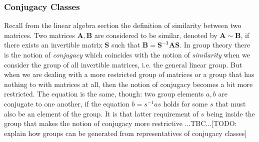 





\subsubsection{Conjugacy Classes}
Recall from the linear algebra section the definition of similarity between two matrices. Two matrices $\mathbf{A,B}$ are considered to be similar, denoted by $\mathbf{A} \sim \mathbf{B}$, if there exists an invertible matrix $\mathbf{S}$ such that $\mathbf{B} = \mathbf{S^{-1} A S}$. In group theory there is the notion of \emph{conjugacy} which coincides with the notion of \emph{similarity} when we consider the group of all invertible matrices, i.e. the general linear group. But when we are dealing with a more restricted group of matrices or a group that has nothing to with matrices at all, then the notion of conjugacy becomes a bit more restricted. The equation is the same, though: two group elements $a,b$ are conjugate to one another, if the equation $b = s^{-1} a s$ holds for some $s$ that must also be an element of the group. It is that latter requirement of $s$ being inside the group that makes the notion of conjugacy more restrictive ...TBC...[TODO: explain how groups can be generated from representatives of conjugacy classes]

